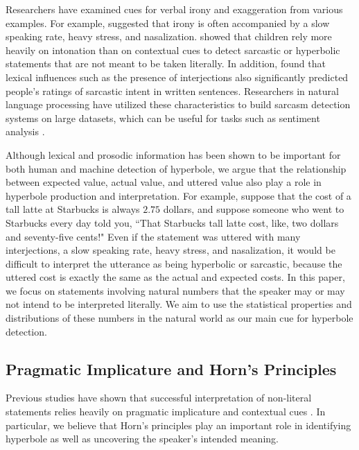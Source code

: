 \documentclass{article} %
\begin{document}
Researchers have examined cues for verbal irony and exaggeration from various examples. For example, \cite{kreuz1995two} suggested that irony is often accompanied by a slow speaking rate, heavy stress, and nasalization. \cite{capelli1990children} showed that children rely more heavily on intonation than on contextual cues to detect sarcastic or hyperbolic statements that are not meant to be taken literally.   
In addition, \cite{kreuz2007lexical} found that lexical influences such as the presence of interjections also significantly predicted people's ratings of sarcastic intent in written sentences. Researchers in natural language processing have utilized these characteristics to build sarcasm detection systems on large datasets, which can be useful for tasks such as sentiment analysis \cite{davidov2010semi, reyes2011mining, van2007algorithm}.

Although lexical and prosodic information has been shown to be important for both human and machine detection of hyperbole, we argue that the relationship between expected value, actual value, and uttered value also play a role in hyperbole production and interpretation. For example, suppose that the cost of a tall latte at Starbucks is always $2.75$ dollars, and suppose someone who went to Starbucks every day told you, ``That Starbucks tall latte cost, like, two dollars and seventy-five cents!" Even if the statement was uttered with many interjections, a slow speaking rate, heavy stress, and nasalization, it would be difficult to interpret the utterance as being hyperbolic or sarcastic, because the uttered cost is exactly the same as the actual and expected costs. In this paper, we focus on statements involving natural numbers that the speaker may or may not intend to be interpreted literally. We aim to use the statistical properties and distributions of these numbers in the natural world as our main cue for hyperbole detection.

\subsection{Pragmatic Implicature and Horn's Principles} 
Previous studies have shown that successful interpretation of non-literal statements relies heavily on pragmatic implicature and contextual cues \cite{moreno2007creativity}. In particular, we believe that Horn's principles play an important role in identifying hyperbole as well as uncovering the speaker's intended meaning. 
\end{document}

